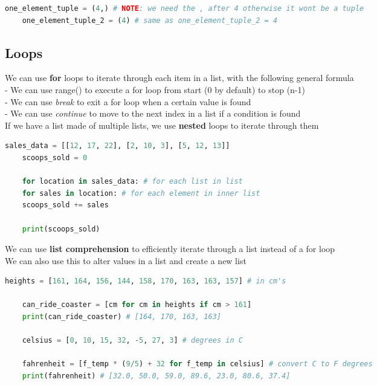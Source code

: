 \documentclass[11pt, a4paper]{article}
\begin{document}
\begin{spacing}{1.1}
\begin{lstlisting}[language=Python]
	one_element_tuple = (4,) # NOTE: we need the , after 4 otherwise it wont be a tuple
	one_element_tuple_2 = (4) # same as one_element_tuple_2 = 4	 \end{lstlisting} \vspace*{4mm}	
	\subsection{Loops}
	We can use \textbf{for} loops to iterate through each item in a list, with the following general formula \\
	\hspace*{3mm} - We can use range() to execute a for loop from start (0 by default) to stop (n-1) \\
	\hspace*{3mm} - We can use \textit{break} to exit a for loop when a certain value is found \\
	\hspace*{3mm} - We can use \textit{continue} to move to the next index in a list if a condition is found \\
	If we have a list made of multiple lists, we use \textbf{nested} loops to iterate through them
	\begin{lstlisting}[language=Python]
	sales_data = [[12, 17, 22], [2, 10, 3], [5, 12, 13]]
	scoops_sold = 0
	
	for location in sales_data: # for each list in list
	for sales in location: # for each element in inner list
	scoops_sold += sales
	
	print(scoops_sold) \end{lstlisting} \newpage
	\noindent We can use \textbf{list comprehension} to efficiently iterate through a list instead of a for loop \\
	We can also use this to alter values in a list and create a new list
	\begin{lstlisting}[language=Python]
	heights = [161, 164, 156, 144, 158, 170, 163, 163, 157] # in cm's
	
	can_ride_coaster = [cm for cm in heights if cm > 161]
	print(can_ride_coaster) # [164, 170, 163, 163] 
	
	celsius = [0, 10, 15, 32, -5, 27, 3] # degrees in C
	
	fahrenheit = [f_temp * (9/5) + 32 for f_temp in celsius] # convert C to F degrees
	print(fahrenheit) # [32.0, 50.0, 59.0, 89.6, 23.0, 80.6, 37.4] \end{lstlisting}\vspace*{4mm}	

\end{spacing}
\end{document}
